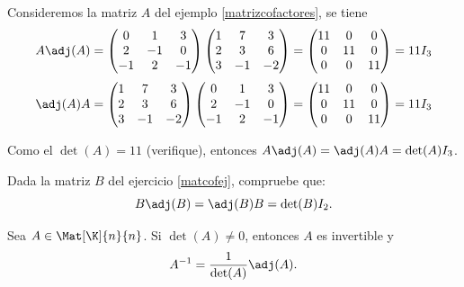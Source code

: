 \documentclass[compacto,10pt]{pubciencias-notas}
\begin{document}
\begin{ejem}
    Consideremos la matriz $A$ del ejemplo \ref{matrizcofactores}, se tiene
    \[
        A \adj(A) = \begin{pmatrix}
            0 & 1 & 3 \\
            2 & -1 & 0 \\
            -1 & 2 & -1
        \end{pmatrix}
        \begin{pmatrix}
            1 & 7 & 3 \\
            2 & 3 & 6 \\
            3 & -1 & -2
        \end{pmatrix} = 
        \begin{pmatrix}
            11 & 0 & 0 \\
            0 & 11 & 0 \\
            0 & 0 & 11
        \end{pmatrix} = 11 I_{3}
    \]
    \[
        \adj(A) A = 
        \begin{pmatrix}
            1 & 7 & 3 \\
            2 & 3 & 6 \\
            3 & -1 & -2
        \end{pmatrix}
        \begin{pmatrix}
            0 & 1 & 3 \\
            2 & -1 & 0 \\
            -1 & 2 & -1
        \end{pmatrix} =
        \begin{pmatrix}
            11 & 0 & 0 \\
            0 & 11 & 0 \\
            0 & 0 & 11
        \end{pmatrix} = 11 I_{3}
    \]
    
    \noindent Como el $\det(A) = 11$ (verifique), entonces $A \adj(A) = \adj(A) A = \det(A) I_{3}$.
\end{ejem}

\begin{ejer} 
    Dada la matriz $B$ del ejercicio \ref{matcofej}, compruebe que:
    \[
        B \adj(B) = \adj(B) B = \det(B) I_{2}.
    \]
\end{ejer}

\begin{cor}
Sea $A\in\Mat[\K]{n}{n}$. Si $\det(A) \neq 0$, entonces 
$A$ es invertible y 
\[
    A^{- 1} = \dfrac{1}{\det(A)}\adj(A).
\]
\end{cor}
\end{document}
